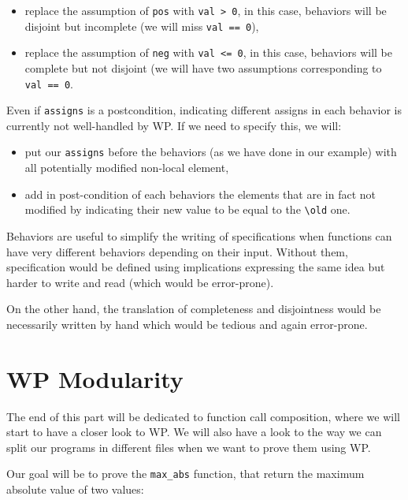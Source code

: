 \documentclass[12pt,francais,]{scrbook}
\providecommand{\tightlist}{%
  \setlength{\itemsep}{0pt}\setlength{\parskip}{0pt}}
\newenvironment{zdsalertblock}[1]{%
  \tcolorbox[beamer,%
    noparskip,breakable,
    colback=LightCoral,colframe=DarkRed,%
    colbacklower=Tomato,%
    title=#1]
}{\endtcolorbox}
\begin{document}
\begin{itemize}
\tightlist
\item
  replace the assumption of \texttt{pos} with
  \texttt{val\ \textgreater{}\ 0}, in this case, behaviors will be
  disjoint but incomplete (we will miss \texttt{val\ ==\ 0}),
\item
  replace the assumption of \texttt{neg} with
  \texttt{val\ \textless{}=\ 0}, in this case, behaviors will be
  complete but not disjoint (we will have two assumptions corresponding
  to \texttt{val\ ==\ 0}.
\end{itemize}

\clearpage

\begin{zdsalertblock}{Warning}
  Even if \texttt{assigns} is a postcondition, indicating different assigns
  in each behavior is currently not well-handled by WP. If we need to specify
  this, we will:
  \begin{itemize}
  \item put our \texttt{assigns} before the behaviors (as we have done in our
    example) with all potentially modified non-local element,
  \item add in post-condition of each behaviors the elements that are in fact
    not modified by indicating their new value to be equal to the
    \texttt{\textbackslash{}old} one.
  \end{itemize}
\end{zdsalertblock}

Behaviors are useful to simplify the writing of specifications when
functions can have very different behaviors depending on their input.
Without them, specification would be defined using implications
expressing the same idea but harder to write and read (which would be
error-prone).

On the other hand, the translation of completeness and disjointness
would be necessarily written by hand which would be tedious and again
error-prone.

\section{WP Modularity}\label{wp-modularity}

The end of this part will be dedicated to function call composition,
where we will start to have a closer look to WP. We will also have a
look to the way we can split our programs in different files when we
want to prove them using WP.

Our goal will be to prove the \texttt{max\_abs} function, that return
the maximum absolute value of two values:
\end{document}

